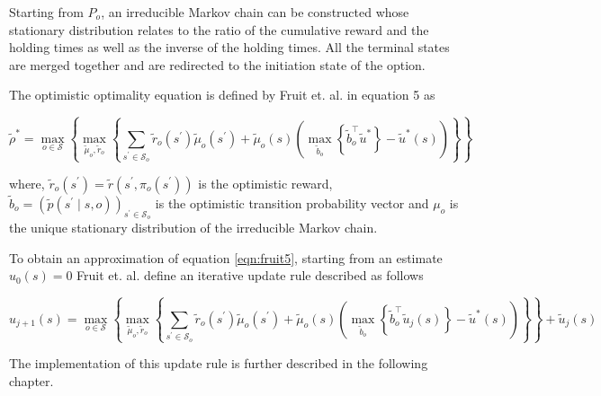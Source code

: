 Starting from $P_o$, an irreducible Markov chain can be constructed whose stationary distribution relates to the ratio of the cumulative reward and the holding times as well as the inverse of the holding times.
All the terminal states are merged together and are redirected to the initiation state of the option.

The optimistic optimality equation is defined by Fruit et. al. \cite{fruit_regret_2017} in equation 5 as

\begin{equation}
    \label{eqn:fruit5}
    \tilde{\rho}^* = \max_{o \in \mathcal{S}} \left\{ \max_{\tilde{\mu}_o, \tilde{r}_o} \left\{ \sum_{s^\prime \in \mathcal{S}_o} \tilde{r}_o(s^\prime) \tilde{\mu}_o(s^\prime) + \tilde{\mu}_o(s) \left( \max_{\tilde{b}_o}\left\{ \tilde{b}_o^\top \tilde{u}^* \right\} - \tilde{u}^*(s) \right)  \right\} \right\}
\end{equation}

where, $ \tilde{r}_o(s^\prime) =  \tilde{r}(s^\prime, \pi_o(s^\prime))$ is the optimistic reward, $\tilde{b}_o = (\tilde{p}(s^\prime \mid s, o))_{s^\prime \in \mathcal{S}_o}$ is the optimistic transition probability vector and $\mu_o$ is the unique stationary distribution of the irreducible Markov chain.

To obtain an approximation of equation \ref{eqn:fruit5}, starting from an estimate $u_0(s) = 0$ Fruit et. al. define an iterative update rule described as follows

\begin{equation}
    \label{eqn:fruit7}
    u_{j+1}(s) = \max_{o \in \mathcal{S}} \left\{ \max_{\tilde{\mu}_o, \tilde{r}_o} \left\{ \sum_{s^\prime \in \mathcal{S}_o} \tilde{r}_o(s^\prime) \tilde{\mu}_o(s^\prime) + \tilde{\mu}_o(s) \left( \max_{\tilde{b}_o}\left\{ \tilde{b}_o^\top \tilde{u}_j(s) \right\} - \tilde{u}^*(s) \right) \right\} \right\} + \tilde{u}_j(s)
\end{equation}

The implementation of this update rule is further described in the following chapter.

